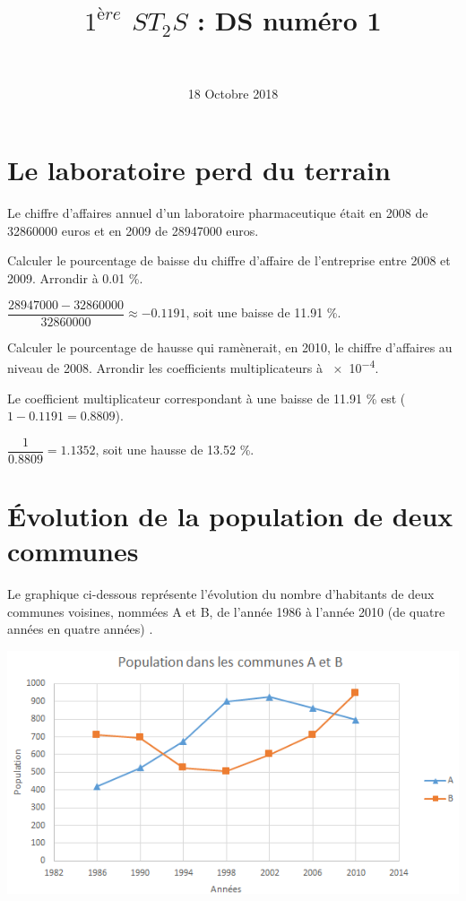 \documentclass[a4paper,11pt]{exam}
\author{\ }
\date{18 Octobre 2018}
\title{$1^{ère}$ $ST_2S$ : DS num\'ero 1}
\begin{document}
%	

	\maketitle


\section{Le laboratoire perd du terrain}

Le chiffre d'affaires annuel d'un laboratoire pharmaceutique était en 2008 de \num{32860000} euros et en 2009 de \num{28947000} euros.
\begin{questions}
	\question Calculer le pourcentage de baisse du chiffre d'affaire de l'entreprise entre 2008 et 2009. Arrondir à \num{0.01} \%.
	\begin{solution}
		$\dfrac{\num{28947000} - \num{32860000}}{\num{32860000}} \approx \num{-0.1191}$, soit une baisse de \num{11.91} \%.
	\end{solution}
	
	\question Calculer le pourcentage de hausse qui ramènerait, en 2010, le chiffre d'affaires au niveau de 2008. Arrondir les coefficients multiplicateurs à \num{e-4}.
	\begin{solution}
		Le coefficient multiplicateur correspondant à une baisse de \num{11.91} \% est ($1-\num{0.1191} = \num{0.8809}$).
		
		$\dfrac{1}{\num{0.8809}} = \num{1.1352}$, soit une hausse de \num{13.52} \%.
	\end{solution}
\end{questions}


\section{\'Evolution de la population de deux communes}


Le graphique ci-dessous représente l'évolution du nombre d'habitants de deux communes voisines, nommées A et B, de l'année 1986 à l'année 2010 (de quatre années en quatre années) .

\begin{center}
	\includegraphics[scale=0.7]{./graph}
\end{center}
\end{document}
